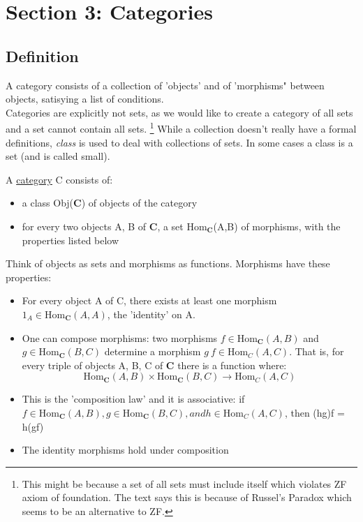 \section{Section 3: Categories}
\subsection{Definition}
A category consists of a collection of 'objects' and of 'morphisms" between objects, satisying a list of conditions.
\\
Categories are explicitly not sets, as we would like to create a category of all sets and a set cannot contain all sets. 
\footnote{This might be because a set of all sets must include itself which violates ZF axiom of foundation. The text says this is because of Russel's Paradox which seems to be an alternative to ZF.}
While a collection doesn't really have a formal definitions, \textit{class} is used to deal with collections of sets. In some cases a class is a set (and is called small).
\begin{definition}
  A \underline{category} C consists of:
  \begin{itemize}
    \item a class Obj(\textbf{C}) of objects of the category
    \item for every two objects A, B of \textbf{C}, a set Hom$_{\textbf{C}}$(A,B) of morphisms, with the properties listed below
  \end{itemize}
\end{definition}
Think of objects as sets and morphisms as functions. Morphisms have these properties: 
\begin{itemize}
  \item For every object A of C, there exists at least one morphism $1_A \in \text{Hom}_{\textbf{C}}(A,A)$, the 'identity' on A.
  \item One can compose morphisms: 
  two morphisms $f \in \text{Hom}_{\textbf{C}} (A,B)$ and $g \in \text{Hom}_{\textbf{C}} (B,C)$ determine a morphism $g \: f \in \text{Hom}_C(A,C)$.
  That is, for every triple of objects A, B, C of \textbf{C} there is a function where:
  \[\text{Hom}_{\textbf{C}} (A,B) \times \text{Hom}_{\textbf{C}} (B,C) \to \text{Hom}_C(A,C)\]
  \item This is the 'composition law' and it is associative: if $f \in \text{Hom}_{\textbf{C}} (A,B), g \in \text{Hom}_{\textbf{C}} (B,C), and h \in \text{Hom}_C(A,C)$, then (hg)f = h(gf)
  \item The identity morphisms hold under composition
\end{itemize}
